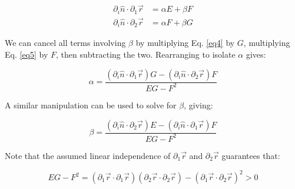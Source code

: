 \documentclass{article}
\begin{document}
{
\newcommand{\ndrone}{\partial_i \hat{n} \cdot \partial_1{\vec{r}}}
\newcommand{\ndrtwo}{\partial_i \hat{n} \cdot \partial_2{\vec{r}}}

\begin{align}
  \label{eq4}
  \ndrone &= \alpha E + \beta F \\
  \label{eq5}
  \ndrtwo &= \alpha F + \beta G
\end{align}

We can cancel all terms involving $\beta$ by multiplying Eq. \eqref{eq4} by $G$, multiplying Eq. \eqref{eq5} by $F$, then subtracting the two. Rearranging to isolate $\alpha$ gives:

\begin{equation}
  \label{eq6}
  \alpha = \frac{(\ndrone)G - (\ndrtwo)F}{EG - F^2}
\end{equation}

A similar manipulation can be used to solve for $\beta$, giving:

\begin{equation}
  \label{eq7}
  \beta = \frac{(\ndrtwo)E - (\ndrone)F}{EG - F^2}
\end{equation}

}

Note that the assumed linear independence of $\partial_1 \vec{r}$ and $\partial_2 \vec{r}$ guarantees that:

\begin{equation*}
EG - F^2 = (\partial_1 \vec{r} \cdot \partial_1 \vec{r})(\partial_2 \vec{r} \cdot \partial_2 \vec{r}) - (\partial_1 \vec{r} \cdot \partial_2 \vec{r})^2 > 0
\end{equation*}
\end{document}
